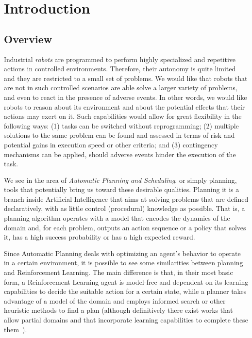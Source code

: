\documentclass[../root.tex]{subfiles}
\begin{document}
\section{Introduction}

\subsection{Overview}
\label{sec:overview}

Industrial \emph{robots} are programmed to perform highly specialized and
repetitive actions in controlled environments. Therefore, their
autonomy is quite limited and they are restricted to a small set of
problems. We would like that robots that are
not in such controlled scenarios are able solve a larger variety of
problems, and even to react in the presence
of adverse events.
In other words, we
would like robots to reason about its environment and about the
potential effects that their actions may exert on it.
Such capabilities would allow for great flexibility in the following
ways: (1) tasks can be switched without reprogramming; (2) multiple
solutions to the same problem can be found and assessed in terms
of risk and potential gains in execution speed or other criteria; and (3)
contingency mechanisms can be applied, should adverse events hinder
the execution of the task.

We see in the area of \emph{Automatic Planning and Scheduling},
or simply planning, tools that potentially bring us toward these
desirable qualities.
Planning it is a branch inside Artificial
Intelligence that aims at solving problems that are defined
declaratively, with as little control (procedural) knowledge
as possible.
That is, a
planning algorithm
operates with a model that encodes the dynamics of the domain and, for
each problem, outputs
an action sequence
or a policy that solves it, has a high success probability or has a high
expected reward.

Since Automatic Planning deals with optimizing an agent's
behavior to operate in a certain environment, it is possible to see some
similarities between planning and Reinforcement Learning. The main difference
is that, in their most basic form, a Reinforcement Learning agent is
model-free and dependent on its learning capabilities to decide the
suitable action for a certain state, while a planner takes advantage of a
model of the domain and employs informed search or other heuristic methods to
find a plan (although definitively there
exist works that allow partial domains and that incorporate learning
capabilities to complete these them~\cite{martinez2017relational,martinez2015vmin}).
\end{document}
